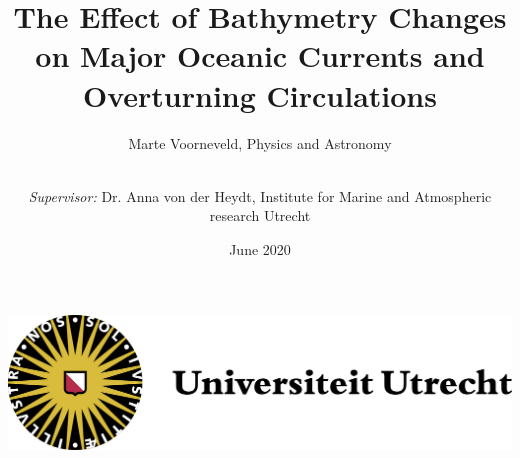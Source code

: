 \documentclass[a4paper]{article}
\title{The Effect of Bathymetry Changes on Major Oceanic Currents and Overturning Circulations}
\date{June 2020}
\author{Marte Voorneveld, Physics and Astronomy
	\and \\ \textit{Supervisor:} Dr. Anna von der Heydt, Institute for Marine and Atmospheric research Utrecht}
\begin{document}
	
%		
%	
%	
%	
%	
%	
%	
%	
%		
\maketitle
\begin{center}
	\includegraphics[width=0.3\linewidth]{uu}
\end{center}
\end{document}
